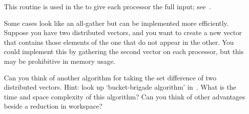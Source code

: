 This routine is used in the
%
 to give each processor the
full input; see~.

Some cases look like an all-gather but can be implemented more
efficiently. Suppose you have two distributed vectors, and you want to
create a new vector that contains those elements of the one that do
not appear in the other. You could implement this by gathering the
second vector on each processor, but this may be prohibitive in memory
usage.

\begin{exercise}
  Can you think of another algorithm for taking the set difference of
  two distributed vectors. Hint: look up `bucket-brigade algorithm'
  in~\cite{Eijkhout:IHPSClulu}. What is the time and space complexity
  of this algorithm? Can you think of other advantages beside a
  reduction in workspace?
\end{exercise}
